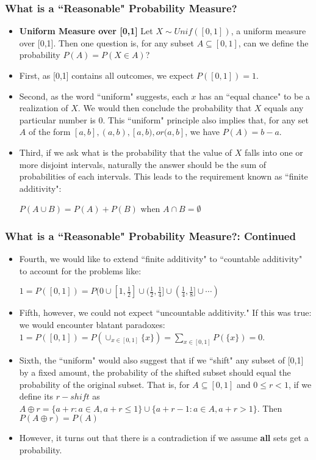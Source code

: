 \documentclass[handout]{beamer}
\begin{document}
\frame
{
  \frametitle{What is a ``Reasonable" Probability Measure? }

   \begin{itemize}
   
 
  \item<1-> \textbf{Uniform Measure over [0,1]}  Let $X\sim Unif ([0,1])$, a uniform measure over [0,1]. Then one question is, for any subset $A\subseteq [0,1]$, can we define the probability $P(A)=P(X\in A)$?
  
 \item<2-> First, as [0,1] contains all outcomes, we expect $P([0,1])=1$. 

 
 
 \item<3-> Second, as the word ``uniform" suggests, each $x$ has an ``equal chance" to be a realization of $X$. We would then conclude the probability that $X$ equals any particular number is $0$. This ``uniform" principle also implies that, for any set $A$ of the form $[a,b], (a,b), [a,b), or (a, b]$, we have $P( A)=b-a$.
 
 
\item<4-> Third, if we ask what is the probability that the value of $X$ falls into one or more disjoint intervals, naturally the answer should be the sum of probabilities of each intervals. This leads to the requirement known as ``finite additivity":
  
$P(A\cup B)=P(A)+P(B)$ when $A \cap B = \emptyset$
  \end{itemize}
}

\frame
{
  \frametitle{What is a ``Reasonable" Probability Measure?: Continued }

   \begin{itemize}
   
 
  
 \item<1-> Fourth, we would like to extend  ``finite additivity" to ``countable additivity" to account for the problems like:
 
 $1=P([0,1])=P({0}\cup [1,\frac{1}{2}]\cup (\frac{1}{2}, \frac{1}{4}]\cup (\frac{1}{4},\frac{1}{8}] \cup \cdots )$

 
 
 \item<2-> Fifth, however, we could not expect ``uncountable additivity." If this was true: we would encounter blatant paradoxes: $1=P([0,1])=P(\cup_{x \in [0,1]} \{x\}) =\sum_{x\in [0,1]} P(\{x\})=0$.
 
  \item<3-> Sixth, the ``uniform" would also suggest that if we ``shift" any subset of [0,1] by a fixed amount, the probability of the shifted subset should equal the probability of the original subset. That is, for $A\subseteq [0,1]$ and $0 \le r < 1$, if we define its $r-shift$ as $A\oplus r=\{a+r: a\in A, a+r\leq 1\} \cup\{a+r-1: a\in A, a+r> 1\} $. Then $P(A\oplus r)=P(A)$

  
  \item<4-> However, it turns out that there is a contradiction if we assume {\bf all} sets get a probability. 
  
    \end{itemize}
}
\end{document}

